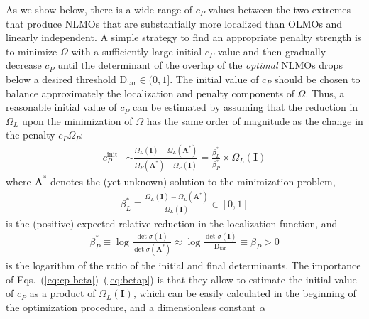 \documentclass[aps,prl,reprint,amsmath,amssymb]{revtex4-1}
\begin{document}
As we show below, there is a wide range of $c_P$ values between the two extremes that produce NLMOs that are substantially more localized than OLMOs and linearly independent.  
%
A simple strategy to find an appropriate penalty strength is to minimize $\Omega$ with a sufficiently large initial $c_P$ value and then gradually decrease $c_P$ until the determinant of the overlap of the \emph{optimal} NLMOs drops below a desired threshold $\text{D}_{\text{tar}} \in (0,1]$. 
The initial value of $c_P$ should be chosen to balance approximately the localization and penalty components of $\Omega$. 
Thus, a reasonable initial value of $c_P$ can be estimated by assuming that the reduction in $\Omega_L$ upon the minimization of $\Omega$ has the same order of magnitude as the change in the penalty $c_P \Omega_P$:
%
\begin{equation} \label{eq:cp-beta}
\begin{split} 
c_P^{\text{init}} & \sim \frac{ \Omega_{L}(\mathbf{I}) - \Omega_{L}(\mathbf{A}^{\ast}) }{ \Omega_{P}(\mathbf{A}^{\ast}) - \Omega_{P}(\mathbf{I}) } = \frac{ \beta_L^{\ast} }{ \beta_P^{\ast} } \times \Omega_{L}(\mathbf{I})
\end{split}
\end{equation}
%
where $\mathbf{A}^{\ast}$ denotes the (yet unknown) solution to the minimization problem, 
%
\begin{equation} 
\begin{split} 
\beta_L^{\ast} \equiv \frac{\Omega_L(\mathbf{I})- \Omega_L(\mathbf{A}^{\ast})}{\Omega_L(\mathbf{I})} \in [0,1]
\end{split}
\end{equation}
%
is the (positive) expected relative reduction in the localization function, and 
%
\begin{equation} \label{eq:betap}
\begin{split} 
\beta_P^{\ast} \equiv \log \frac{\det \sigma(\mathbf{I})}{ \det \sigma(\mathbf{A}^{\ast}) } \approx \log \frac{\det \sigma(\mathbf{I})}{ \text{D}_{\text{tar}} } \equiv \beta_P > 0
\end{split}
\end{equation}
%
is the logarithm of the ratio of the initial and final determinants. 
The importance of Eqs.~(\ref{eq:cp-beta})--(\ref{eq:betap}) is that they allow to estimate the initial value of $c_P$ as a product of $\Omega_L(\mathbf{I})$, which can be easily calculated in the beginning of the optimization procedure, and a dimensionless constant $\alpha$
\end{document}
